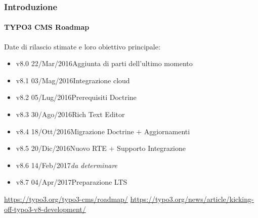 \begin{frame}[fragile]
	\frametitle{Introduzione}
	\framesubtitle{TYPO3 CMS Roadmap}

	Date di rilascio stimate e loro obiettivo principale:

	\begin{itemize}

		\item v8.0 \tabto{1.1cm}22/Mar/2016\tabto{3.4cm}Aggiunta di parti dell'ultimo momento
		\item v8.1 \tabto{1.1cm}03/Mag/2016\tabto{3.4cm}Integrazione cloud
		\item v8.2 \tabto{1.1cm}05/Lug/2016\tabto{3.4cm}Prerequisiti Doctrine
		\item v8.3 \tabto{1.1cm}30/Ago/2016\tabto{3.4cm}Rich Text Editor
		\item v8.4 \tabto{1.1cm}18/Ott/2016\tabto{3.4cm}Migrazione Doctrine + Aggiornamenti
		\item
			\begingroup
				\color{typo3orange}
					v8.5 \tabto{1.1cm}20/Dic/2016\tabto{3.4cm}Nuovo RTE + Supporto Integrazione
			\endgroup
		\item v8.6 \tabto{1.1cm}14/Feb/2017\tabto{3.4cm}\textit{da determinare}
		\item v8.7 \tabto{1.1cm}04/Apr/2017\tabto{3.4cm}Preparazione LTS

	\end{itemize}

	\smaller
		\url{https://typo3.org/typo3-cms/roadmap/}\newline
		\url{https://typo3.org/news/article/kicking-off-typo3-v8-development/}
	\normalsize

\end{frame}

